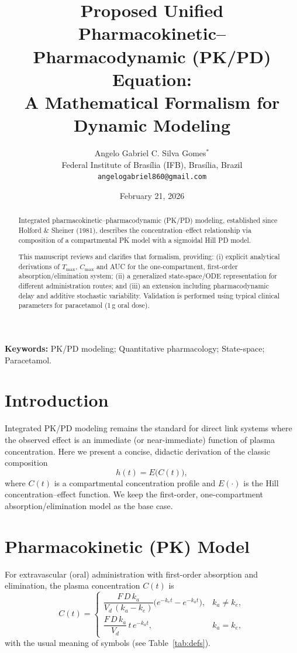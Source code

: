 \documentclass[10pt,a4paper]{article}
\title{Proposed Unified Pharmacokinetic--Pharmacodynamic (PK/PD) Equation:\\
A Mathematical Formalism for Dynamic Modeling}
\author{Angelo Gabriel C. Silva Gomes$^{*}$\\
Federal Institute of Brasília (IFB), Brasília, Brazil\\
\texttt{angelogabriel860@gmail.com}}
\date{February 21, 2026}
\begin{document}
\maketitle

\begin{abstract}
Integrated pharmacokinetic--pharmacodynamic (PK/PD) modeling, established since Holford \& Sheiner (1981), describes the concentration--effect relationship via composition of a compartmental PK model with a sigmoidal Hill PD model.

This manuscript reviews and clarifies that formalism, providing: (i) explicit analytical derivations of $T_{\max}$, $C_{\max}$ and AUC for the one-compartment, first-order absorption/elimination system; (ii) a generalized state-space/ODE representation for different administration routes; and (iii) an extension including pharmacodynamic delay and additive stochastic variability. Validation is performed using typical clinical parameters for paracetamol (1\,g oral dose).
\end{abstract}

\noindent\textbf{Keywords:} PK/PD modeling; Quantitative pharmacology; State-space; Paracetamol.

\section{Introduction}

Integrated PK/PD modeling remains the standard for direct link systems where the observed effect is an immediate (or near-immediate) function of plasma concentration. Here we present a concise, didactic derivation of the classic composition
\[
h(t) = E\big(C(t)\big),
\]
where $C(t)$ is a compartmental concentration profile and $E(\cdot)$ is the Hill concentration--effect function. We keep the first-order, one-compartment absorption/elimination model as the base case.

\section{Pharmacokinetic (PK) Model}

For extravascular (oral) administration with first-order absorption and elimination, the plasma concentration $C(t)$ is
\begin{equation}
C(t) =
\begin{cases}
\dfrac{F \, D \, k_a}{V_d \, (k_a - k_e)} \bigl(e^{-k_e t} - e^{-k_a t}\bigr), & k_a \neq k_e,\\[8pt]
\dfrac{F \, D \, k_a}{V_d} \, t \, e^{-k_a t}, & k_a = k_e,
\end{cases}
\label{eq:pk}
\end{equation}
with the usual meaning of symbols (see Table~\ref{tab:defs}).
\end{document}
